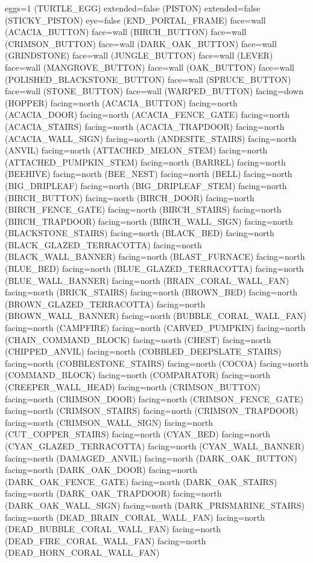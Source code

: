 \documentclass[11pt]{article}
\begin{document}
eggs=1 (TURTLE_EGG)
extended=false (PISTON)
extended=false (STICKY_PISTON)
eye=false (END_PORTAL_FRAME)
face=wall (ACACIA_BUTTON)
face=wall (BIRCH_BUTTON)
face=wall (CRIMSON_BUTTON)
face=wall (DARK_OAK_BUTTON)
face=wall (GRINDSTONE)
face=wall (JUNGLE_BUTTON)
face=wall (LEVER)
face=wall (MANGROVE_BUTTON)
face=wall (OAK_BUTTON)
face=wall (POLISHED_BLACKSTONE_BUTTON)
face=wall (SPRUCE_BUTTON)
face=wall (STONE_BUTTON)
face=wall (WARPED_BUTTON)
facing=down (HOPPER)
facing=north (ACACIA_BUTTON)
facing=north (ACACIA_DOOR)
facing=north (ACACIA_FENCE_GATE)
facing=north (ACACIA_STAIRS)
facing=north (ACACIA_TRAPDOOR)
facing=north (ACACIA_WALL_SIGN)
facing=north (ANDESITE_STAIRS)
facing=north (ANVIL)
facing=north (ATTACHED_MELON_STEM)
facing=north (ATTACHED_PUMPKIN_STEM)
facing=north (BARREL)
facing=north (BEEHIVE)
facing=north (BEE_NEST)
facing=north (BELL)
facing=north (BIG_DRIPLEAF)
facing=north (BIG_DRIPLEAF_STEM)
facing=north (BIRCH_BUTTON)
facing=north (BIRCH_DOOR)
facing=north (BIRCH_FENCE_GATE)
facing=north (BIRCH_STAIRS)
facing=north (BIRCH_TRAPDOOR)
facing=north (BIRCH_WALL_SIGN)
facing=north (BLACKSTONE_STAIRS)
facing=north (BLACK_BED)
facing=north (BLACK_GLAZED_TERRACOTTA)
facing=north (BLACK_WALL_BANNER)
facing=north (BLAST_FURNACE)
facing=north (BLUE_BED)
facing=north (BLUE_GLAZED_TERRACOTTA)
facing=north (BLUE_WALL_BANNER)
facing=north (BRAIN_CORAL_WALL_FAN)
facing=north (BRICK_STAIRS)
facing=north (BROWN_BED)
facing=north (BROWN_GLAZED_TERRACOTTA)
facing=north (BROWN_WALL_BANNER)
facing=north (BUBBLE_CORAL_WALL_FAN)
facing=north (CAMPFIRE)
facing=north (CARVED_PUMPKIN)
facing=north (CHAIN_COMMAND_BLOCK)
facing=north (CHEST)
facing=north (CHIPPED_ANVIL)
facing=north (COBBLED_DEEPSLATE_STAIRS)
facing=north (COBBLESTONE_STAIRS)
facing=north (COCOA)
facing=north (COMMAND_BLOCK)
facing=north (COMPARATOR)
facing=north (CREEPER_WALL_HEAD)
facing=north (CRIMSON_BUTTON)
facing=north (CRIMSON_DOOR)
facing=north (CRIMSON_FENCE_GATE)
facing=north (CRIMSON_STAIRS)
facing=north (CRIMSON_TRAPDOOR)
facing=north (CRIMSON_WALL_SIGN)
facing=north (CUT_COPPER_STAIRS)
facing=north (CYAN_BED)
facing=north (CYAN_GLAZED_TERRACOTTA)
facing=north (CYAN_WALL_BANNER)
facing=north (DAMAGED_ANVIL)
facing=north (DARK_OAK_BUTTON)
facing=north (DARK_OAK_DOOR)
facing=north (DARK_OAK_FENCE_GATE)
facing=north (DARK_OAK_STAIRS)
facing=north (DARK_OAK_TRAPDOOR)
facing=north (DARK_OAK_WALL_SIGN)
facing=north (DARK_PRISMARINE_STAIRS)
facing=north (DEAD_BRAIN_CORAL_WALL_FAN)
facing=north (DEAD_BUBBLE_CORAL_WALL_FAN)
facing=north (DEAD_FIRE_CORAL_WALL_FAN)
facing=north (DEAD_HORN_CORAL_WALL_FAN)
\end{document}
